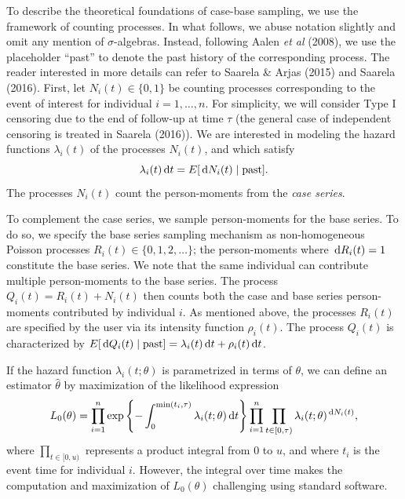 To describe the theoretical foundations of case-base sampling, we use the framework of counting processes. In what follows, we abuse notation slightly and omit any mention of \(\sigma\)-algebras. Instead, following Aalen \textit{et al} (2008), we use the placeholder ``past'' to denote the past history of the corresponding process. The reader interested in more details can refer to Saarela \& Arjas (2015) and Saarela (2016). First, let \(N_{i}(t) \in \{0, 1\}\) be counting processes corresponding to the event of interest for individual \(i=1, \ldots,n\). For simplicity, we will consider Type I censoring due to the end of follow-up at time \(\tau\) (the general case of independent censoring is treated in Saarela (2016)). We are interested in modeling the hazard functions \(\lambda_{i}(t)\) of the processes \(N_i(t)\), and which satisfy
\[\lambda_{i}(t)\,\textrm dt = E[\,\textrm dN_{i}(t)\mid \mathrm{past}].\] The processes \(N_i(t)\) count the person-moments from the \emph{case series}.

To complement the case series, we sample person-moments for the base series. To do so, we specify the base series sampling mechanism as non-homogeneous Poisson processes \(R_i(t) \in \{0, 1, 2, \ldots\}\); the person-moments where \(\,\textrm dR_i(t) = 1\) constitute the base series. We note that the same individual can contribute multiple person-moments to the base series. The process \(Q_{i}(t) = R_i(t) + N_{i}(t)\) then counts both the case and base series person-moments contributed by individual \(i\). As mentioned above, the processes \(R_i(t)\) are specified by the user via its intensity function \(\rho_i(t)\). The process \(Q_{i}(t)\) is characterized by \(E[\,\textrm dQ_{i}(t)\mid\mathrm{past}] = \lambda_{i}(t)\,\textrm dt + \rho_i(t)\,\textrm dt\).

If the hazard function \(\lambda_{i}(t; \theta)\) is parametrized in terms of \(\theta\), we can define an estimator \(\widehat{\theta}\) by maximization of the likelihood expression
\[L_0(\theta) = \prod_{i=1}^n \exp\left\{ -\int_0^{\min(t_i,\tau)} \lambda_i(t; \theta)\,\textrm dt \right\} \prod_{i=1}^{n} \prod_{t\in[0,\tau)} \lambda_{i}(t;\theta)^{\,\textrm dN_{i}(t)},\]
where \(\prod_{t\in[0,u)}\) represents a product integral from \(0\) to \(u\), and where \(t_i\) is the event time for individual \(i\). However, the integral over time makes the computation and maximization of \(L_0(\theta)\) challenging using standard software.

